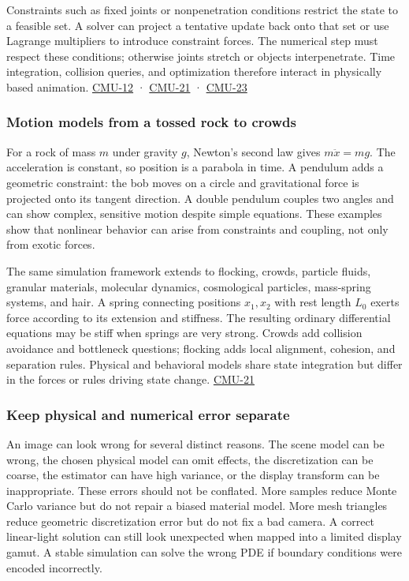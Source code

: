 Constraints such as fixed joints or nonpenetration conditions restrict the state to a feasible set. A solver can project a tentative update back onto that set or use Lagrange multipliers to introduce constraint forces. The numerical step must respect these conditions; otherwise joints stretch or objects interpenetrate. Time integration, collision queries, and optimization therefore interact in physically based animation. \hyperref[04-visual-computing-ii-ch036]{CMU-12} · \hyperref[04-visual-computing-ii-ch036]{CMU-21} · \hyperref[04-visual-computing-ii-ch036]{CMU-23}

\subsubsection{Motion models from a tossed rock to crowds}\label{motion-models-from-a-tossed-rock-to-crowds}

For a rock of mass \(m\) under gravity \(g\), Newton's second law gives \(m\ddot x=mg\). The acceleration is constant, so position is a parabola in time. A pendulum adds a geometric constraint: the bob moves on a circle and gravitational force is projected onto its tangent direction. A double pendulum couples two angles and can show complex, sensitive motion despite simple equations. These examples show that nonlinear behavior can arise from constraints and coupling, not only from exotic forces.

The same simulation framework extends to flocking, crowds, particle fluids, granular materials, molecular dynamics, cosmological particles, mass-spring systems, and hair. A spring connecting positions \(x_1,x_2\) with rest length \(L_0\) exerts force according to its extension and stiffness. The resulting ordinary differential equations may be stiff when springs are very strong. Crowds add collision avoidance and bottleneck questions; flocking adds local alignment, cohesion, and separation rules. Physical and behavioral models share state integration but differ in the forces or rules driving state change. \hyperref[04-visual-computing-ii-ch036]{CMU-21}

\subsubsection{Keep physical and numerical error separate}\label{keep-physical-and-numerical-error-separate}

An image can look wrong for several distinct reasons. The scene model can be wrong, the chosen physical model can omit effects, the discretization can be coarse, the estimator can have high variance, or the display transform can be inappropriate. These errors should not be conflated. More samples reduce Monte Carlo variance but do not repair a biased material model. More mesh triangles reduce geometric discretization error but do not fix a bad camera. A correct linear-light solution can still look unexpected when mapped into a limited display gamut. A stable simulation can solve the wrong PDE if boundary conditions were encoded incorrectly.

